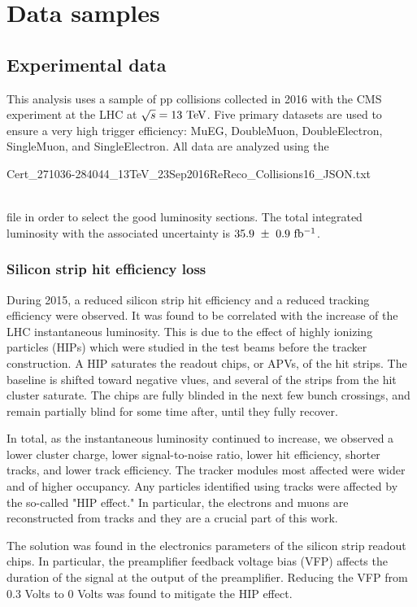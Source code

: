 \chapter{Data samples}
\section{Experimental data}
This analysis uses a sample of pp collisions collected in 2016 with the CMS 
experiment at the LHC at $\sqrt{s} = 13~\rm{TeV}$. Five primary datasets  
are used to ensure a very high trigger efficiency: MuEG, DoubleMuon, 
DoubleElectron, SingleMuon, and SingleElectron. All data are analyzed using the
\\
\centerline{\small Cert\_271036-284044\_13TeV\_23Sep2016ReReco\_Collisions16\_JSON.txt}
\\
file in order to select the good luminosity sections. 
The total integrated luminosity with the associated uncertainty is $35.9~\pm~0.9~\mathrm{fb^{-1}}$.

\subsection{Silicon strip hit efficiency loss}
\label{ss:hips}
During 2015, a reduced silicon strip hit efficiency and a reduced tracking efficiency were observed.
It was found to be correlated with the increase of the LHC instantaneous luminosity.
This is due to the effect of highly ionizing particles (HIPs) which were studied in the test beams
before the tracker construction. A HIP saturates the readout chips, or APVs, of the hit strips.
The baseline is shifted toward negative vlues, and several of the strips from the hit cluster saturate.
The chips are fully blinded in the next few bunch crossings, and remain partially blind for some time after, until they fully recover.

In total, as the instantaneous luminosity continued to increase, we observed a lower cluster charge, lower signal-to-noise ratio, lower hit efficiency, shorter tracks, and lower track efficiency.
The tracker modules most affected were wider and of higher occupancy. %
Any particles identified using tracks were affected by the so-called "HIP effect."
In particular, the electrons and muons are reconstructed from tracks and they are a crucial part of this work.

The solution was found in the electronics parameters of the silicon strip readout chips.
In particular, the preamplifier feedback voltage bias (VFP) affects the duration
of the signal at the output of the preamplifier.
Reducing the VFP from 0.3 Volts to 0 Volts was found to mitigate the HIP effect. 

